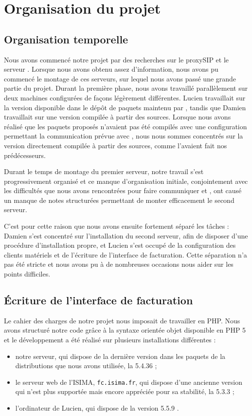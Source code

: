 \section{Organisation du projet}

\subsection{Organisation temporelle}



Nous avons commencé notre projet par des recherches sur le proxySIP {\kam} et le serveur {\frad}. Lorsque nous avons obtenu assez d'information, nous avons pu commencé le montage de ces serveurs, sur lequel nous avons passé une grande partie du projet.
Durant la première phase, nous avons travaillé parallèlement sur deux machines configurées de façons légèrement différentes. Lucien travaillait sur la version disponible dans le dépôt de paquets maintenu par {\kam}, tandis que Damien travaillait sur une version compilée à partir des sources. Lorsque nous avons réalisé que les paquets proposés n’avaient pas été compilés avec une configuration permettant la communication prévue avec {\frad}, nous nous sommes concentrés sur la version directement compilée à partir des sources, comme l’avaient fait nos prédécesseurs.

Durant le temps de montage du premier serveur, notre travail s’est progressivement organisé et ce manque d’organisation initiale, conjointement avec les difficultés que nous avons rencontrées pour faire communiquer {\kam} et {\frad}, ont causé un manque de notes structurées permettant de monter efficacement le second serveur.

C’est pour cette raison que nous avons ensuite fortement séparé les tâches : Damien s’est concentré sur l’installation du second serveur, afin de disposer d’une procédure d’installation propre, et Lucien s’est occupé de la configuration des clients matériels et de l’écriture de l’interface de facturation. Cette séparation n’a pas été stricte et nous avons pu à de nombreuses occasions nous aider sur les points difficiles.

\subsection{Écriture de l’interface de facturation}

Le cahier des charges de notre projet nous imposait de travailler en PHP. Nous avons structuré notre code grâce à la syntaxe orientée objet disponible en PHP 5 et le développement a été réalisé sur plusieurs installations différentes :
\begin{itemize}
	\item notre serveur, qui dispose de la dernière version dans les paquets de la distributions que nous avons utilisée, la 5.4.36 ;
	\item le serveur web de l’ISIMA, \texttt{fc.isima.fr}, qui dispose d’une ancienne version qui n’est plus supportée mais encore appréciée pour sa stabilité, la 5.3.3 ;
	\item l’ordinateur de Lucien, qui dispose de la version 5.5.9 .
\end{itemize}

